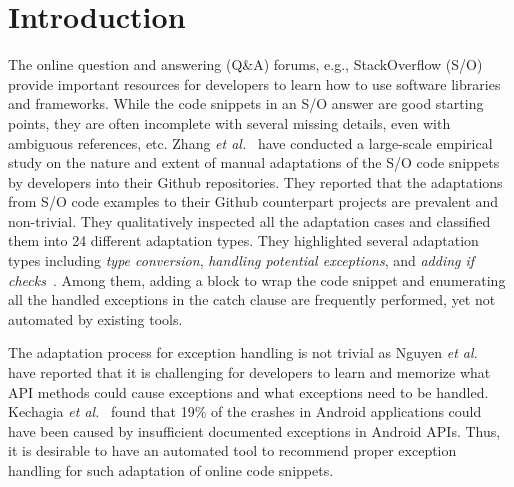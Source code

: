 \section{Introduction}
\label{sec:intro}

The online question and answering (Q\&A) forums, e.g., StackOverflow
(S/O) provide important resources for developers to learn how to use
software libraries and frameworks. While the code snippets in an S/O
answer are good starting points, they are often incomplete with
several missing details, even with ambiguous references, etc.  Zhang
{\em et al.}~\cite{zhang-icse19} have conducted a large-scale
empirical study on the nature and extent of manual adaptations of the
S/O code snippets by developers into their Github repositories.  They
reported that the adaptations from S/O code examples to their
Github counterpart projects are prevalent and non-trivial. They
qualitatively inspected all the adaptation cases and classified them
into 24 different adaptation types. They highlighted several
adaptation types including {\em type conversion}, {\em handling
  potential exceptions}, and {\em adding if
  checks}~\cite{zhang-icse19}. Among them, adding a 
block to wrap the code snippet and enumerating all the handled
exceptions in the catch clause are frequently performed,
yet not automated by existing tools.

The adaptation process for exception handling is not trivial as Nguyen
{\em et al.}~\cite{xrank-fse20} have reported that it is challenging
for developers to learn and memorize what API methods could cause
exceptions and what exceptions need to be handled. Kechagia {\em et
  al.}~\cite{kechagia-msr14} found that 19\% of the crashes in Android
applications could have been caused by insufficient documented
exceptions in Android APIs. Thus, it is desirable to have an automated
tool to recommend proper exception handling for such adaptation of
online code snippets.

